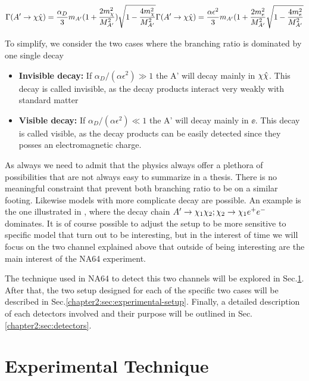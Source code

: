 \begin{equation}
  \label{chapter1:eq:dm-bratio}
  \Gamma(A'\rightarrow\chi \hat{\chi}) = \frac{\alpha_D}{3}m_{A'}(1 + \frac{2m^2_{\chi}}{M^2_{A'}})\sqrt{1 - \frac{4m^2_{\chi}}{M^2_{A'}}}   
  \Gamma(A'\rightarrow\chi \hat{\chi}) = \frac{\alpha \epsilon^2}{3}m_{A'}(1 + \frac{2m^2_{e}}{M^2_{A'}}\sqrt{1 - \frac{4m^2_{e}}{M^2_{A'}}} 
\end{equation}

To simplify, we consider the two cases where the branching ratio is dominated by one single decay

\begin{itemize}
\item \textbf{Invisible decay:} If $\alpha_D / (\alpha \epsilon^2) \gg 1$ the A' will decay mainly in $\chi \hat{\chi}$. This decay is called invisible, as the decay products interact very weakly with standard matter
\item \textbf{Visible decay:} If $\alpha_D / (\alpha \epsilon^2) \ll 1$ the A' will decay mainly in $\ee$. This decay is called visible, as the decay products can be easily detected since they posses an electromagnetic charge. 
\end{itemize}

As always we need to admit that the physics always offer a plethora of possibilities that are not always easy to summarize in a thesis. There is no meaningful constraint that prevent both branching ratio to be on a similar footing. Likewise models with more complicate decay are possible. An example is the one illustrated in \cite{Mohlabeng_2019}, where the decay chain $A' \to \chi_1 \chi_2; \chi_2 \to \chi_1 e^+e^-$ dominates. It is of course possible to adjust the setup to be more sensitive to specific model that turn out to be interesting, but in the interest of time we will focus on the two channel explained above that outside of being interesting are the main interest of the NA64 experiment.

The technique used in NA64 to detect this two channels will be explored in Sec.\ref{chapter2:sec:experimental-technique}. After that, the two setup designed for each of the specific two cases will be described in Sec.\ref{chapter2:sec:experimental-setup}. Finally, a detailed description of each detectors involved and their purpose will be outlined in Sec.\ref{chapter2:sec:detectors}.


\section{Experimental Technique}
\label{chapter2:sec:experimental-technique}

